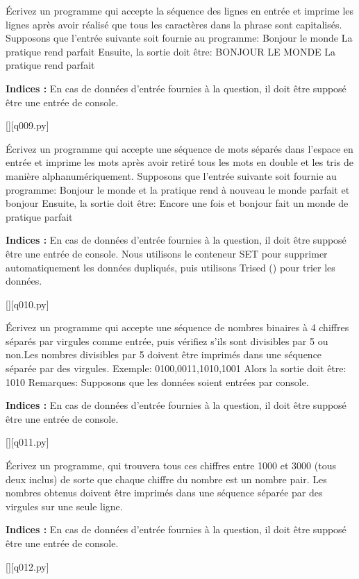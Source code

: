 \question
Écrivez un programme qui accepte la séquence des lignes en entrée et imprime les lignes après avoir réalisé que tous les caractères dans la phrase sont capitalisés.
Supposons que l'entrée suivante soit fournie au programme:
Bonjour le monde
La pratique rend parfait
Ensuite, la sortie doit être:
BONJOUR LE MONDE
La pratique rend parfait
\par
\textbf{Indices : }En cas de données d'entrée fournies à la question, il doit être supposé être une entrée de console.
\renewcommand{\nomfichier}{q009.py}
\begin{solution}
    \pythonfile{\chemincode \nomfichier}[][q009.py]
\end{solution}


\question
Écrivez un programme qui accepte une séquence de mots séparés dans l'espace en entrée et imprime les mots après avoir retiré tous les mots en double et les tris de manière alphanumériquement.
Supposons que l'entrée suivante soit fournie au programme:
Bonjour le monde et la pratique rend à nouveau le monde parfait et bonjour
Ensuite, la sortie doit être:
Encore une fois et bonjour fait un monde de pratique parfait
\par
\textbf{Indices : }En cas de données d'entrée fournies à la question, il doit être supposé être une entrée de console.
Nous utilisons le conteneur SET pour supprimer automatiquement les données dupliqués, puis utilisons Trised () pour trier les données.
\renewcommand{\nomfichier}{q010.py}
\begin{solution}
    \pythonfile{\chemincode \nomfichier}[][q010.py]
\end{solution}


\question
Écrivez un programme qui accepte une séquence de nombres binaires à 4 chiffres séparés par virgules comme entrée, puis vérifiez s'ils sont divisibles par 5 ou non.Les nombres divisibles par 5 doivent être imprimés dans une séquence séparée par des virgules.
Exemple:
0100,0011,1010,1001
Alors la sortie doit être:
1010
Remarques: Supposons que les données soient entrées par console.
\par
\textbf{Indices : }En cas de données d'entrée fournies à la question, il doit être supposé être une entrée de console.
\renewcommand{\nomfichier}{q011.py}
\begin{solution}
    \pythonfile{\chemincode \nomfichier}[][q011.py]
\end{solution}


\question
Écrivez un programme, qui trouvera tous ces chiffres entre 1000 et 3000 (tous deux inclus) de sorte que chaque chiffre du nombre est un nombre pair.
Les nombres obtenus doivent être imprimés dans une séquence séparée par des virgules sur une seule ligne.
\par
\textbf{Indices : }En cas de données d'entrée fournies à la question, il doit être supposé être une entrée de console.
\renewcommand{\nomfichier}{q012.py}
\begin{solution}
    \pythonfile{\chemincode \nomfichier}[][q012.py]
\end{solution}



